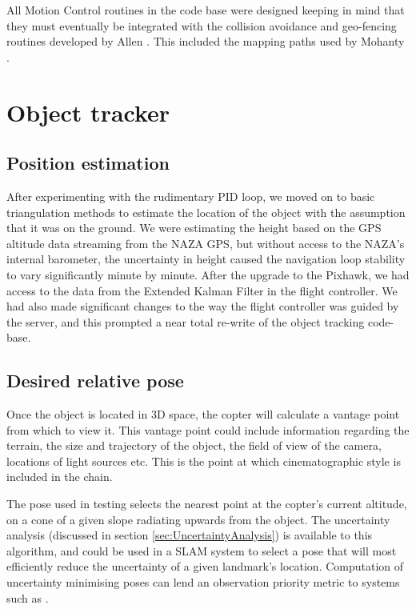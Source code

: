 \documentclass[a4paper, 11pt, titlepage]{article}
\begin{document}
    All Motion Control routines in the code base were designed keeping in mind that they must eventually be integrated with the collision avoidance and geo-fencing routines developed by Allen \cite{Allen}.  This included the mapping paths used by Mohanty \cite{Mohanty}.

\section{Object tracker}

  \subsection{Position estimation}
    After experimenting with the rudimentary PID loop, we moved on to basic triangulation methods to estimate the location of the object with the assumption that it was on the ground.  We were estimating the height based on the GPS altitude data streaming from the NAZA GPS, but without access to the NAZA's internal barometer, the uncertainty in height caused the navigation loop stability to vary significantly minute by minute.
    After the upgrade to the Pixhawk, we had access to the data from the Extended Kalman Filter in the flight controller.  We had also made significant changes to the way the flight controller was guided by the server, and this prompted a near total re-write of the object tracking code-base.

  \subsection{Desired relative pose}
    Once the object is located in 3D space, the copter will calculate a vantage point from which to view it.
    This vantage point could include information regarding the terrain, the size and trajectory of the object, the field of view of the camera, locations of light sources etc.  This is the point at which cinematographic style is included in the chain.

    The pose used in testing selects the nearest point at the copter's current altitude, on a cone of a given slope radiating upwards from the object.
    The uncertainty analysis (discussed in section \ref{sec:UncertaintyAnalysis}) is available to this algorithm, and could be used in a SLAM system to select a pose that will most efficiently reduce the uncertainty of a given landmark's location.  Computation of uncertainty minimising poses can lend an observation priority metric to systems such as \cite{TrilatUnderwater}.
\end{document}
